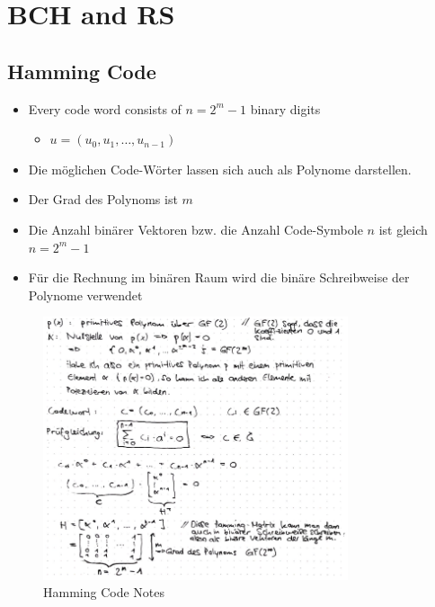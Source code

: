 \hypertarget{bch-and-rs}{%
\section{BCH and RS}\label{bch-and-rs}}

\hypertarget{hamming-code}{%
\subsection{Hamming Code}\label{hamming-code}}

\begin{itemize}
\tightlist
\item
  Every code word consists of $n = 2^m - 1$ binary digits

  \begin{itemize}
  \tightlist
  \item
    $u = (u_0 , u_1 , \ldots{}, u_{n-1} )$
  \end{itemize}
\item
  Die möglichen Code-Wörter lassen sich auch als Polynome darstellen.
\item
  Der Grad des Polynoms ist $m$
\item
  Die Anzahl binärer Vektoren bzw. die Anzahl Code-Symbole $n$ ist gleich
  $n = 2^m - 1$
\item
  Für die Rechnung im binären Raum wird die binäre Schreibweise der
  Polynome verwendet
\end{itemize}

\begin{figure}[H]
\centering
\includegraphics[width=0.8\textwidth]{figures/hamming-code.png}
\caption{Hamming Code Notes}
\end{figure}

